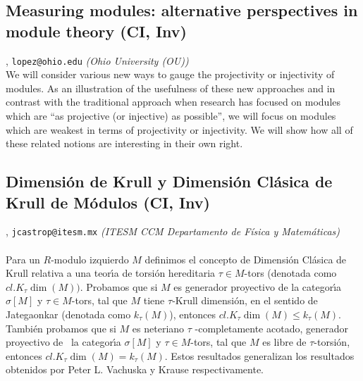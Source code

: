 \subsection{\sffamily Measuring modules: alternative perspectives in module theory {\footnotesize (CI, Inv)}} \label{reg-1282} 
, {\tt lopez@ohio.edu}  {\slshape (Ohio University (OU))}\\
          \noindent We will consider various new ways to gauge the projectivity or injectivity of modules. As an illustration of the usefulness of these new approaches and in contrast with the traditional approach when research has focused on modules which are ``as projective (or injective) as possible'', we will focus on modules which are weakest in terms of projectivity or injectivity. We will show how all of these related notions are interesting in their own right.
\subsection{\sffamily Dimensi\'on de Krull y Dimensi\'on Cl\'asica de Krull de M\'odulos {\footnotesize (CI, Inv)}} \label{reg-345} 
, {\tt jcastrop@itesm.mx}  {\slshape (ITESM CCM Departamento de F\'isica y Matem\'aticas)}\\
\\
\noindent  Para un $R$-modulo izquierdo $M$ definimos el concepto de Dimensi\'{o}n Cl\'{a}sica de Krull relativa a una teor\'{\i}a de torsi\'{o}n hereditaria $\tau \in M$-tors (denotada como $cl.K_{\tau }\dim \left( M\right) )$. Probamos que si $M$ es generador proyectivo de la categor\'{\i}a $\sigma  \left[ M\right] $ y $\tau \in M$-tors, tal que $M$ tiene $\tau $-Krull dimensi\'{o}n, en el sentido de Jategaonkar (denotada como $k_{\tau }\left( M\right) $), entonces $cl.K_{\tau }\dim \left( M\right) \leq k_{\tau }\left( M\right)$. Tambi\'{e}n probamos que si $M$ es neteriano $\tau $ -completamente acotado, generador proyectivo de \ la categor\'{\i}a $\sigma  \left[ M\right] $ y $\tau \in M$-tors, tal que $M$ es libre de $\tau $-torsi\'{o}n, entonces $cl.K_{\tau }\dim \left( M\right) =k_{\tau }\left( M\right)  $. Estos resultados generalizan los resultados obtenidos por Peter L. Vachuska y Krause respectivamente.
